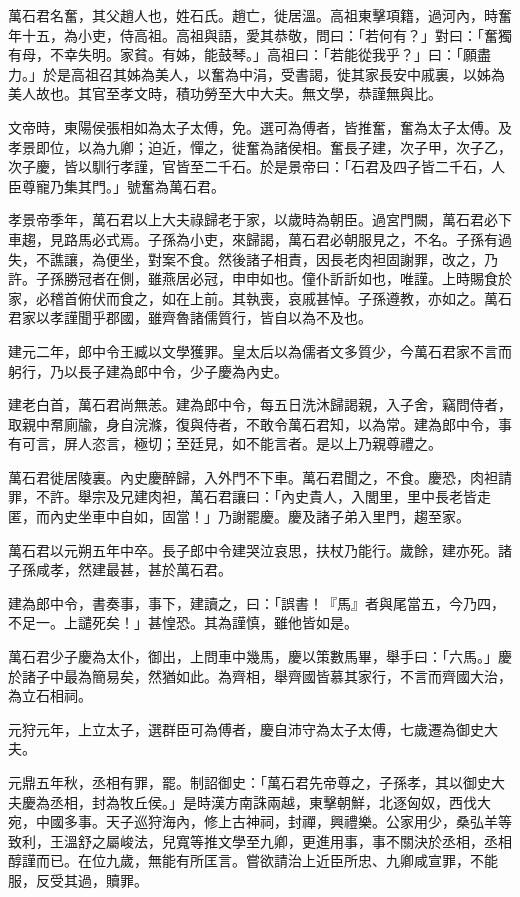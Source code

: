 
\begin{pinyinscope}
萬石君名奮，其父趙人也，姓石氏。趙亡，徙居溫。高祖東擊項籍，過河內，時奮年十五，為小吏，侍高祖。高祖與語，愛其恭敬，問曰：「若何有？」對曰：「奮獨有母，不幸失明。家貧。有姊，能鼓琴。」高祖曰：「若能從我乎？」曰：「願盡力。」於是高祖召其姊為美人，以奮為中涓，受書謁，徙其家長安中戚裏，以姊為美人故也。其官至孝文時，積功勞至大中大夫。無文學，恭謹無與比。

文帝時，東陽侯張相如為太子太傅，免。選可為傅者，皆推奮，奮為太子太傅。及孝景即位，以為九卿；迫近，憚之，徙奮為諸侯相。奮長子建，次子甲，次子乙，次子慶，皆以馴行孝謹，官皆至二千石。於是景帝曰：「石君及四子皆二千石，人臣尊寵乃集其門。」號奮為萬石君。

孝景帝季年，萬石君以上大夫祿歸老于家，以歲時為朝臣。過宮門闕，萬石君必下車趨，見路馬必式焉。子孫為小吏，來歸謁，萬石君必朝服見之，不名。子孫有過失，不譙讓，為便坐，對案不食。然後諸子相責，因長老肉袒固謝罪，改之，乃許。子孫勝冠者在側，雖燕居必冠，申申如也。僮仆訢訢如也，唯謹。上時賜食於家，必稽首俯伏而食之，如在上前。其執喪，哀戚甚悼。子孫遵教，亦如之。萬石君家以孝謹聞乎郡國，雖齊魯諸儒質行，皆自以為不及也。

建元二年，郎中令王臧以文學獲罪。皇太后以為儒者文多質少，今萬石君家不言而躬行，乃以長子建為郎中令，少子慶為內史。

建老白首，萬石君尚無恙。建為郎中令，每五日洗沐歸謁親，入子舍，竊問侍者，取親中帬廁牏，身自浣滌，復與侍者，不敢令萬石君知，以為常。建為郎中令，事有可言，屏人恣言，極切；至廷見，如不能言者。是以上乃親尊禮之。

萬石君徙居陵裏。內史慶醉歸，入外門不下車。萬石君聞之，不食。慶恐，肉袒請罪，不許。舉宗及兄建肉袒，萬石君讓曰：「內史貴人，入閭里，里中長老皆走匿，而內史坐車中自如，固當！」乃謝罷慶。慶及諸子弟入里門，趨至家。

萬石君以元朔五年中卒。長子郎中令建哭泣哀思，扶杖乃能行。歲餘，建亦死。諸子孫咸孝，然建最甚，甚於萬石君。

建為郎中令，書奏事，事下，建讀之，曰：「誤書！『馬』者與尾當五，今乃四，不足一。上譴死矣！」甚惶恐。其為謹慎，雖他皆如是。

萬石君少子慶為太仆，御出，上問車中幾馬，慶以策數馬畢，舉手曰：「六馬。」慶於諸子中最為簡易矣，然猶如此。為齊相，舉齊國皆慕其家行，不言而齊國大治，為立石相祠。

元狩元年，上立太子，選群臣可為傅者，慶自沛守為太子太傅，七歲遷為御史大夫。

元鼎五年秋，丞相有罪，罷。制詔御史：「萬石君先帝尊之，子孫孝，其以御史大夫慶為丞相，封為牧丘侯。」是時漢方南誅兩越，東擊朝鮮，北逐匈奴，西伐大宛，中國多事。天子巡狩海內，修上古神祠，封禪，興禮樂。公家用少，桑弘羊等致利，王溫舒之屬峻法，兒寬等推文學至九卿，更進用事，事不關決於丞相，丞相醇謹而已。在位九歲，無能有所匡言。嘗欲請治上近臣所忠、九卿咸宣罪，不能服，反受其過，贖罪。


\end{pinyinscope}
